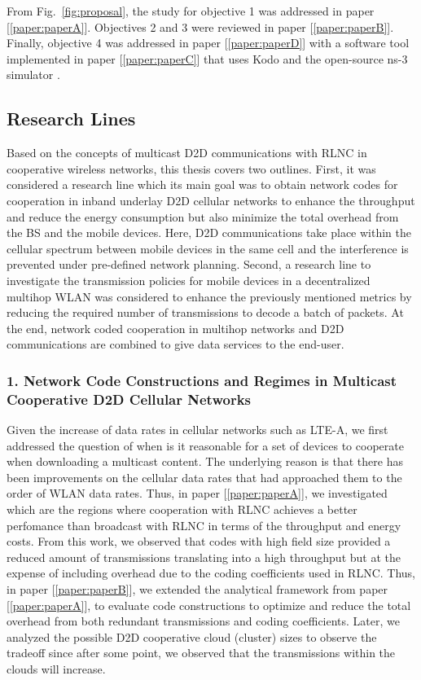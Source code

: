 From Fig.~\ref{fig:proposal}, the study for objective 1 was addressed in paper {[\ref{paper:paperA}]}. Objectives 2 and 3 were reviewed in paper {[\ref{paper:paperB}]}. Finally, objective 4 was addressed in paper {[\ref{paper:paperD}]} with a software tool implemented in paper {[\ref{paper:paperC}]} that uses Kodo and the open-source ns-3 simulator \cite{ns3link}.

\subsection{Research Lines}

Based on the concepts of multicast \ac{D2D} communications with \ac{RLNC} in cooperative wireless networks, this thesis covers two outlines. First, it was considered a research line which its main goal was to obtain network codes for cooperation in inband underlay \ac{D2D} cellular networks to enhance the throughput and reduce the energy consumption but also minimize the total overhead from the \ac{BS} and the mobile devices. Here, \ac{D2D} communications take place within the cellular spectrum between mobile devices in the same cell and the interference is prevented under pre-defined network planning. Second, a research line to investigate the transmission policies for mobile devices in a decentralized multihop \ac{WLAN} was considered to enhance the previously mentioned metrics by reducing the required number of transmissions to decode a batch of packets. At the end, network coded cooperation in multihop networks and \ac{D2D} communications are combined to give data services to the end-user.

\subsubsection{1. Network Code Constructions and Regimes in Multicast Cooperative D2D Cellular Networks}

Given the increase of data rates in cellular networks such as \ac{LTE-A}, we first addressed the question of when is it reasonable for a set of devices to cooperate when downloading a multicast content. The underlying reason is that there has been improvements on the cellular data rates that had approached them to the order of \ac{WLAN} data rates. Thus, in paper {[\ref{paper:paperA}]}, we investigated which are the regions where cooperation with \ac{RLNC} achieves a better perfomance than broadcast with \ac{RLNC} in terms of the throughput and energy costs. From this work, we observed that codes with high field size provided a reduced amount of transmissions translating into a high throughput but at the expense of including overhead due to the coding coefficients used in \ac{RLNC}. Thus, in paper {[\ref{paper:paperB}]}, we extended the analytical framework from paper {[\ref{paper:paperA}]}, to evaluate code constructions to optimize and reduce the total overhead from both redundant transmissions and coding coefficients. Later, we analyzed the possible \ac{D2D} cooperative cloud (cluster) sizes to observe the tradeoff since after some point, we observed that the transmissions within the clouds will increase.


